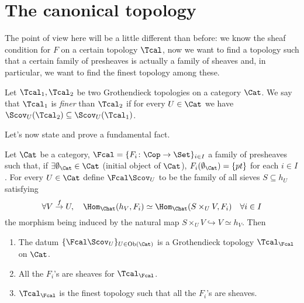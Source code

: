 \documentclass[a4paper]{article}
\begin{document}
    \section{The canonical topology}
         The point of view here will be a little different than before: we know the sheaf condition for $F$ on a certain topology $\Tcal$, now we want to find a topology such that a certain family of presheaves is actually a family of sheaves and, in particular, we want to find the finest topology among these.
         \begin{defn}
             Let $\Tcal_1, \Tcal_2$ be two Grothendieck topologies on a category $\Cat$. We say that $\Tcal_1$ is \emph{finer} than $\Tcal_2$ if for every $U \in \Cat$ we have $\Scov_U(\Tcal_2) \subseteq \Scov_U(\Tcal_1)$.
         \end{defn}
         Let's now state and prove a fundamental fact.
         \begin{prop}
             Let $\Cat$ be a category, $\Fcal = \{F_i\colon \Cop \to \Set\}_{i \in I}$ a family of presheaves such that, if $\exists \emptyset_{\Cat} \in \Cat$ (initial object of $\Cat$), $F_i(\emptyset_{\Cat}) = \{pt\}$ for each $i \in I$. For every $U \in \Cat$ define $\Fcal\Scov_U$ to be the family of all sieves $S \subseteq h_U$ satisfying \[\forall V \stackrel{f}{\to} U,\quad \Hom_{\Chat}(h_V, F_i) \simeq \Hom_{\Chat}(S \times_U V, F_i) \quad \forall i \in I \] the morphism being induced by the natural map $S \times_U V \hookrightarrow V \simeq h_V$. Then 
             \begin{enumerate}
                 \item The datum $\{\Fcal\Scov_U\}_{U \in \textrm{Ob}(\Cat)}$ is a Grothendieck topology $\Tcal_{\Fcal}$ on $\Cat$.
                 \item All the $F_i$'s are sheaves for $\Tcal_{\Fcal}$.
                 \item $\Tcal_{\Fcal}$ is the finest topology such that all the $F_i$'s are sheaves.
             \end{enumerate}
         \end{prop}
\end{document}
